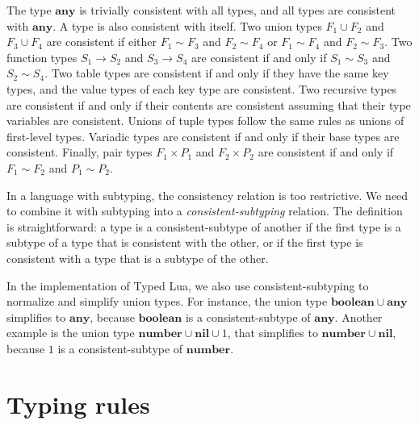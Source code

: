 \documentclass[10pt]{sigplanconf}
\newcommand{\Any}{\mathbf{any}}
\newcommand{\Nil}{\mathbf{nil}}
\newcommand{\Boolean}{\mathbf{boolean}}
\newcommand{\Number}{\mathbf{number}}
\begin{document}
The type $\Any$ is trivially consistent with all types, and all types
are consistent with $\Any$. A type is also consistent with
itself. Two union types $F_1 \cup F_2$ and $F_3 \cup F_4$ are
consistent if either $F_1 \sim F_3$ and $F_2 \sim F_4$ or
$F_1 \sim F_4$ and $F_2 \sim F_3$. Two function types
$S_1 \rightarrow S_2$ and $S_3 \rightarrow S_4$ are consistent
if and only if $S_1 \sim S_3$ and $S_2 \sim S_4$. Two table types are consistent if and only if they have the same key types, and the value types of each key type are consistent. Two recursive types are consistent if and only if their contents are consistent assuming that their type variables are consistent. Unions of tuple types follow the same rules as unions of first-level types. Variadic types are consistent if and only if their base types are consistent. 
Finally, pair types $F_1 \times P_1$ and $F_2 \times P_2$ are
consistent if and only if $F_1 \sim F_2$ and $P_1 \sim P_2$.

In a language with subtyping, the consistency relation is
too restrictive. We need to combine it with subtyping into a
{\em consistent-subtyping} relation. The definition is
straightforward: a type is a consistent-subtype
of another if the first type is a subtype of a type
that is consistent with the other, or if the first type
is consistent with a type that is a subtype of the other.

In the implementation of Typed Lua, we also use consistent-subtyping to normalize and simplify union types.
For instance, the union type $\Boolean \cup \Any$ simplifies
to $\Any$, because $\Boolean$ is a consistent-subtype
of $\Any$. Another example is the union type
$\Number \cup \Nil \cup 1$, that simplifies to
$\Number \cup \Nil$, because $1$ is a consistent-subtype of $\Number$.

\section{Typing rules}
\label{sec:rules}
\end{document}
